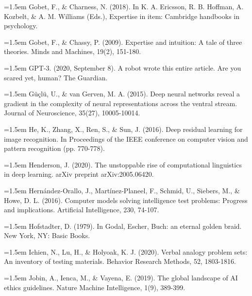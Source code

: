 \hangindent=1.5em
Gobet, F., \& Charness, N. (2018).
In K. A. Ericsson, R. B. Hoffman, A. Kozbelt,
\& A. M. Williams (Eds.),
Expertise in item: Cambridge handbooks in psychology.
\par

\hangindent=1.5em
Gobet, F., \& Chassy, P. (2009).
Expertise and intuition: A tale of three theories.
Minds and Machines, 19(2), 151-180.
\par

\hangindent=1.5em
GPT-3. (2020, September 8).
A robot wrote this entire article. Are you scared yet, human?
The Guardian.
\par

\hangindent=1.5em
Güçlü, U., \& van Gerven, M. A. (2015).
Deep neural networks reveal a gradient in the complexity of neural
representations across the ventral stream.
Journal of Neuroscience, 35(27), 10005-10014.
\par

\hangindent=1.5em
He, K., Zhang, X., Ren, S., \& Sun, J. (2016).
Deep residual learning for image recognition.
In Proceedings of the IEEE conference on computer vision and
pattern recognition (pp. 770-778).
\par

\hangindent=1.5em
Henderson, J. (2020).
The unstoppable rise of computational linguistics in deep learning.
arXiv preprint arXiv:2005.06420.
\par

\hangindent=1.5em
Hernández-Orallo, J., Martínez-Planeel, F., Schmid, U.,
Siebers, M., \& Howe, D. L. (2016).
Computer models solving intelligence test problems:
Progress and implications.
Artificial Intelligence, 230, 74-107.
\par

\hangindent=1.5em
Hofstadter, D. (1979).
In Godal, Escher, Buch: an eternal golden braid.
New York, NY: Basic Books.
\par

\hangindent=1.5em
Ichien, N., Lu, H., \& Holyoak, K. J. (2020).
Verbal analogy problem sets: An inventory of testing materials.
Behavior Research Methods, 52, 1803-1816.
\par

\hangindent=1.5em
Jobin, A., Ienca, M., \& Vayena, E. (2019).
The global landscape of AI ethics guidelines.
Nature Machine Intelligence, 1(9), 389-399.
\par


